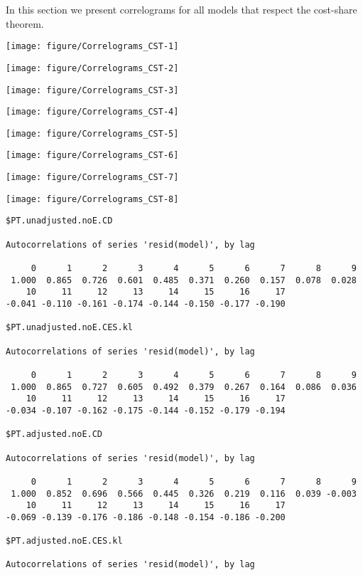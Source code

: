 \documentclass[preprint,authoryear,12pt]{elsarticle}\usepackage[]{graphicx}\usepackage[]{color}
\makeatletter
\def\maxwidth{ %
  \ifdim\Gin@nat@width>\linewidth
    \linewidth
  \else
    \Gin@nat@width
  \fi
}
\newenvironment{kframe}{%
 \def\at@end@of@kframe{}%
 \ifinner\ifhmode%
  \def\at@end@of@kframe{\end{minipage}}%
  \begin{minipage}{\columnwidth}%
 \fi\fi%
 \def\FrameCommand##1{\hskip\@totalleftmargin \hskip-\fboxsep
 \colorbox{shadecolor}{##1}\hskip-\fboxsep
     \hskip-\linewidth \hskip-\@totalleftmargin \hskip\columnwidth}%
 \MakeFramed {\advance\hsize-\width
   \@totalleftmargin\z@ \linewidth\hsize
   \@setminipage}}%
 {\par\unskip\endMakeFramed%
 \at@end@of@kframe}
\newenvironment{knitrout}{}{} %
\makeatother
\begin{document}
In this section we present correlograms for all models that respect the cost-share theorem.

\begin{knitrout}
\color{fgcolor}
\texttt{[image: figure/Correlograms\_CST-1]} 

\texttt{[image: figure/Correlograms\_CST-2]} 

\texttt{[image: figure/Correlograms\_CST-3]} 

\texttt{[image: figure/Correlograms\_CST-4]} 

\texttt{[image: figure/Correlograms\_CST-5]} 

\texttt{[image: figure/Correlograms\_CST-6]} 

\texttt{[image: figure/Correlograms\_CST-7]} 

\texttt{[image: figure/Correlograms\_CST-8]} 
\begin{kframe}\begin{verbatim}
$PT.unadjusted.noE.CD

Autocorrelations of series 'resid(model)', by lag

     0      1      2      3      4      5      6      7      8      9 
 1.000  0.865  0.726  0.601  0.485  0.371  0.260  0.157  0.078  0.028 
    10     11     12     13     14     15     16     17 
-0.041 -0.110 -0.161 -0.174 -0.144 -0.150 -0.177 -0.190 

$PT.unadjusted.noE.CES.kl

Autocorrelations of series 'resid(model)', by lag

     0      1      2      3      4      5      6      7      8      9 
 1.000  0.865  0.727  0.605  0.492  0.379  0.267  0.164  0.086  0.036 
    10     11     12     13     14     15     16     17 
-0.034 -0.107 -0.162 -0.175 -0.144 -0.152 -0.179 -0.194 

$PT.adjusted.noE.CD

Autocorrelations of series 'resid(model)', by lag

     0      1      2      3      4      5      6      7      8      9 
 1.000  0.852  0.696  0.566  0.445  0.326  0.219  0.116  0.039 -0.003 
    10     11     12     13     14     15     16     17 
-0.069 -0.139 -0.176 -0.186 -0.148 -0.154 -0.186 -0.200 

$PT.adjusted.noE.CES.kl

Autocorrelations of series 'resid(model)', by lag


\end{verbatim}
\end{kframe}
\end{knitrout}
\end{document}
